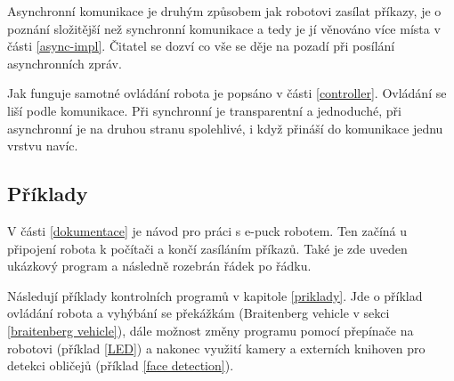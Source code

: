 Asynchronní komunikace je druhým způsobem jak robotovi zasílat příkazy, je
o poznání složitější než synchronní komunikace a tedy je jí věnováno více
místa v části \ref{async-impl}. Čitatel se dozví co vše se děje na pozadí
při posílání asynchronních zpráv.

Jak funguje samotné ovládání robota je popsáno v části \ref{controller}.
Ovládání se liší podle komunikace. Při synchronní je transparentní a
jednoduché, při asynchronní je na druhou stranu spolehlivé, i když přináší
do komunikace jednu vrstvu navíc.

\subsection*{Příklady}

V části \ref{dokumentace} je návod pro práci s e-puck robotem. Ten začíná u
připojení robota k počítači a končí zasíláním příkazů. Také je zde uveden
ukázkový program a následně rozebrán řádek po řádku.

Následují příklady kontrolních programů v kapitole \ref{priklady}. Jde o
příklad ovládání robota a vyhýbání se překážkám (Braitenberg vehicle v
sekci \ref{braitenberg vehicle}), dále možnost změny programu pomocí
přepínače na robotovi (příklad \ref{LED}) a nakonec využití kamery a
externích knihoven pro detekci obličejů (příklad \ref{face detection}).

